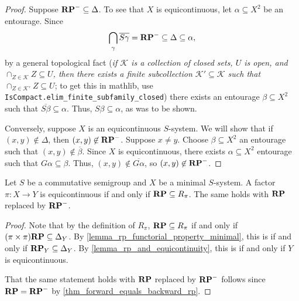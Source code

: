 \begin{proof}
\leanok{}
    Suppose $\mathbf{RP}^- \subseteq \Delta$.  To see that $X$ is equicontinuous, let $\alpha \subseteq X^2$ be an entourage.  Since
    \[
        \bigcap_{\gamma} \overline{S \gamma} = \mathbf{RP}^- \subseteq \Delta \subseteq \alpha,
    \]
    by a general topological fact (\emph{if $\mathcal{K}$ is a collection of closed sets, $U$ is open, and $\cap_{Z \in \mathcal{K}} Z \subseteq U$, then there exists a finite subcollection $\mathcal{K}' \subseteq \mathcal{K}$ such that $\cap_{Z \in \mathcal{K}'} Z \subseteq U$}; to get this in mathlib, use \verb|IsCompact.elim_finite_subfamily_closed|) there exists an entourage $\beta \subseteq X^2$ such that $\overline{S \beta} \subseteq \alpha$.  Thus, $S \beta \subseteq \alpha$, as was to be shown.

    Conversely, suppose $X$ is an equicontinuous $S$-system.
    We will show that if $(x,y) \not\in \Delta$, then $(x,y) \not\in \mathbf{RP}^-$. Suppose $x \neq y$.  Choose $\beta \subseteq X^2$ an entourage such that $(x,y) \not\in \overline{\beta}$.  Since $X$ is equicontinuous, there exists $\alpha \subseteq X^2$ entourage such that $G \alpha \subseteq \beta$.  Thus, $(x,y) \not\in \overline{G \alpha}$, so $(x,y) \not\in \mathbf{RP}^-$.
\end{proof}

\begin{lemma}
    \label{lemma_rp_characterization_of_equicont}
    \leanok{}
    Let $S$ be a commutative semigroup and $X$ be a minimal $S$-system.  A factor $\pi: X \to Y$ is equicontinuous if and only if $\mathbf{RP} \subseteq R_\pi$.  The same holds with $\mathbf{RP}$ replaced by $\mathbf{RP}^-$.
\end{lemma}

\begin{proof}
    Note that by the definition of $R_\pi$, $\mathbf{RP} \subseteq R_\pi$ if and only if $(\pi \times \pi) \mathbf{RP} \subseteq \Delta_Y$.  By \cref{lemma_rp_functorial_property_minimal}, this is if and only if $\mathbf{RP}_Y \subseteq \Delta_Y$.  By \cref{lemma_rp_and_equicontinuity}, this is if and only if $Y$ is equicontinuous.

    That the same statement holds with $\mathbf{RP}$ replaced by $\mathbf{RP}^-$ follows since $\mathbf{RP} = \mathbf{RP}^-$ by \cref{thm_forward_equals_backward_rp}.
\end{proof}

